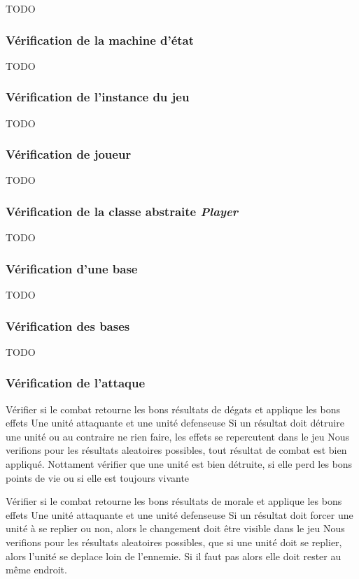 TODO

\subsubsection{Vérification de la machine d'état}

TODO

\subsubsection{Vérification de l'instance du jeu}

TODO

\subsubsection{Vérification de joueur}

TODO

\subsubsection{Vérification de la classe abstraite \emph{Player}}

TODO

\subsubsection{Vérification d'une base}

TODO

\subsubsection{Vérification des bases}

TODO

\subsubsection{Vérification de l'attaque}

\mytest
{Vérifier si le combat retourne les bons résultats de dégats et applique les bons effets}
{Une unité attaquante et une unité defenseuse}
{Si un résultat doit détruire une unité ou au contraire ne rien faire, les effets se repercutent dans le jeu}
{Nous verifions pour les résultats aleatoires possibles, tout résultat de combat est bien appliqué. Nottament vérifier
que une unité est bien détruite, si elle perd les bons points de vie ou si elle est toujours vivante}

\mytest
{Vérifier si le combat retourne les bons résultats de morale et applique les bons effets}
{Une unité attaquante et une unité defenseuse}
{Si un résultat doit forcer une unité à se replier ou non, alors le changement doit être visible dans le jeu}
{Nous verifions pour les résultats aleatoires possibles, que si une unité doit se replier, alors l'unité se
deplace loin de l'ennemie. Si il faut pas alors elle doit rester au même endroit.}

